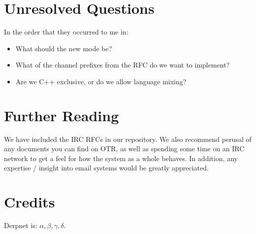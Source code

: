 \documentclass[11pt]{article}
\begin{document}
\section{Unresolved Questions}

In the order that they occurred to me in:

\begin{itemize}
\item 
  What should the new mode be?
\item
  What of the channel prefixes from the RFC do we want to implement?
\item
  Are we C++ exclusive, or do we allow language mixing?
\end{itemize}

\section{Further Reading}

We have included the IRC RFCs in our repository.  We also recommend perusal of
any documents you can find on OTR, as well as spending some time on an IRC
network to get a feel for how the system as a whole behaves.  In addition, any
expertise / insight into email systems would be greatly appreciated.

\section{Credits}

Derpnet is: $\alpha, \beta, \gamma, \delta$.
\end{document}
